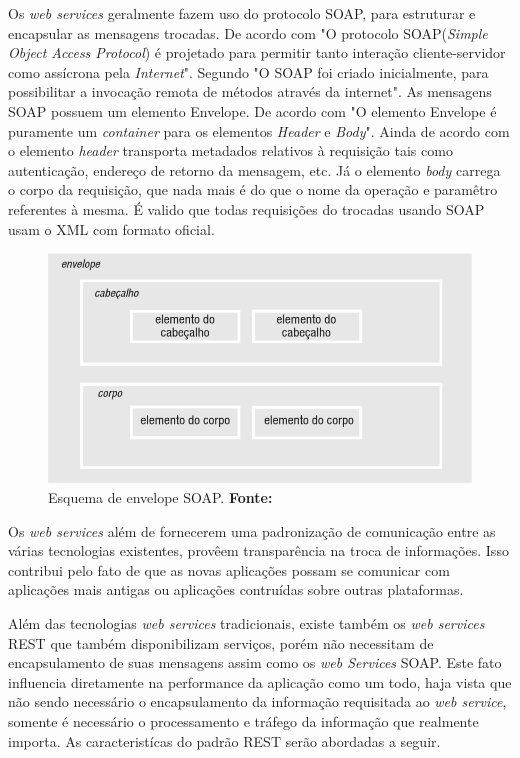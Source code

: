 	\par Os \textit{web services} geralmente fazem uso do protocolo SOAP, para
estruturar e encapsular as mensagens trocadas. De acordo com
 "O protocolo SOAP(\textit{Simple Object Access
Protocol}) é projetado para permitir tanto interação cliente-servidor como
assícrona pela \textit{Internet}". Segundo  "O
SOAP foi criado inicialmente, para possibilitar a invocação remota de métodos
através da internet". As mensagens SOAP possuem um elemento Envelope. De acordo
com  "O elemento Envelope é puramente um
\textit{container} para os elementos \textit{Header} e \textit{Body}". Ainda de
acordo com  o elemento \textit{header} transporta
metadados relativos à requisição tais como autenticação, endereço de retorno da
mensagem, etc. Já o elemento \textit{body} carrega o corpo da requisição, que
nada mais é do que o nome da operação e paramêtro referentes à mesma. É valido
que todas requisições do trocadas usando SOAP usam o XML com formato oficial.

\begin{figure}[h!]
	\centerline{\includegraphics[scale=0.8]{./imagens/imagem2.png}}
	\caption[Esquema de envelope SOAP. ]{Esquema de envelope SOAP. 
	 \textbf{Fonte:}}
	\label{fig:exemplo3}
\end{figure}
	

	\par Os \textit{web services} além de fornecerem uma padronização de
comunicação entre as várias tecnologias existentes, provêem transparência na
troca de informações. Isso contribui pelo fato de que as novas aplicações
possam se comunicar com aplicações mais antigas ou aplicações contruídas sobre
outras plataformas.

	\par Além das tecnologias \textit{web services} tradicionais, existe também os
\textit{web services} REST que também disponibilizam serviços, porém não
necessitam de encapsulamento de suas mensagens assim como os \textit{web
Services} SOAP. Este fato influencia diretamente na performance da aplicação
como um todo, haja vista que não sendo necessário o encapsulamento da informação
requisitada ao \textit{web service}, somente é necessário o processamento e
tráfego da informação que realmente importa. As caracteristícas do padrão REST
serão abordadas a seguir.

